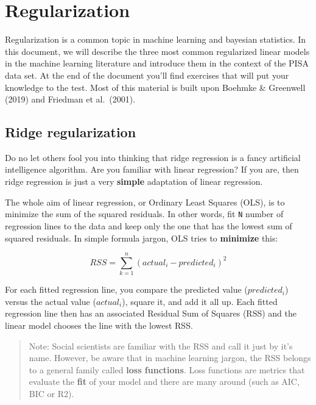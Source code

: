 \documentclass[
]{book}
\begin{document}
\hypertarget{regularization}{%
\chapter{Regularization}\label{regularization}}

Regularization is a common topic in machine learning and bayesian statistics. In this document, we will describe the three most common regularized linear models in the machine learning literature and introduce them in the context of the PISA data set. At the end of the document you'll find exercises that will put your knowledge to the test. Most of this material is built upon Boehmke \& Greenwell (2019) and Friedman et al.~(2001).

\hypertarget{ridge-regularization}{%
\section{Ridge regularization}\label{ridge-regularization}}

Do no let others fool you into thinking that ridge regression is a fancy artificial intelligence algorithm. Are you familiar with linear regression? If you are, then ridge regression is just a very \textbf{simple} adaptation of linear regression.

The whole aim of linear regression, or Ordinary Least Squares (OLS), is to minimize the sum of the squared residuals. In other words, fit \texttt{N} number of regression lines to the data and keep only the one that has the lowest sum of squared residuals. In simple formula jargon, OLS tries to \textbf{minimize} this:

\begin{equation}
RSS = \sum_{k = 1}^n(actual_i - predicted_i)^2
\end{equation}

For each fitted regression line, you compare the predicted value (\(predicted_i\)) versus the actual value (\(actual_i\)), square it, and add it all up. Each fitted regression line then has an associated Residual Sum of Squares (RSS) and the linear model chooses the line with the lowest RSS.

\begin{quote}
Note: Social scientists are familiar with the RSS and call it just by it's name. However, be aware that in machine learning jargon, the RSS belongs to a general family called \textbf{loss functions}. Loss functions are metrics that evaluate the \textbf{fit} of your model and there are many around (such as AIC, BIC or R2).
\end{quote}
\end{document}
